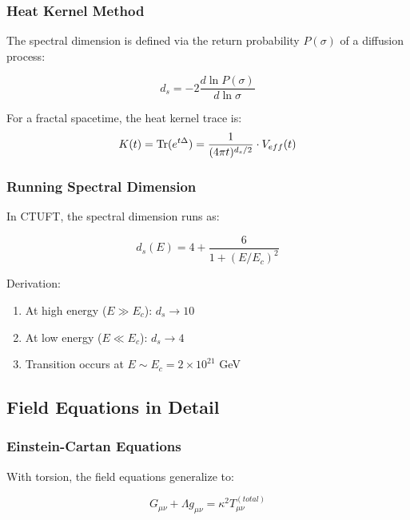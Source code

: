 \subsubsection{Heat Kernel Method}

The spectral dimension is defined via the return probability $P(\sigma)$ of a diffusion process:

\begin{equation}
    d_s = -2\frac{d\ln P(\sigma)}{d\ln \sigma}
\end{equation}

For a fractal spacetime, the heat kernel trace is:
\begin{equation}
    K(t) = \mathrm{Tr}(e^{t\Delta}) = \frac{1}{(4\pi t)^{d_s/2}} \cdot V_{eff}(t)
\end{equation}

\subsubsection{Running Spectral Dimension}

In CTUFT, the spectral dimension runs as:

\begin{equation}
    d_s(E) = 4 + \frac{6}{1 + (E/E_c)^2}
\end{equation}

Derivation:
\begin{enumerate}
    \item At high energy ($E \gg E_c$): $d_s \to 10$
    \item At low energy ($E \ll E_c$): $d_s \to 4$
    \item Transition occurs at $E \sim E_c = 2 \times 10^{21}$ GeV
\end{enumerate}

\subsection{Field Equations in Detail}

\subsubsection{Einstein-Cartan Equations}

With torsion, the field equations generalize to:

\begin{equation}
    G_{\mu\nu} + \Lambda g_{\mu\nu} = \kappa^2 T_{\mu\nu}^{(total)}
\end{equation}

